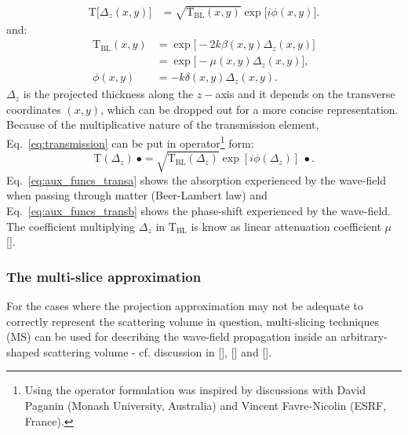 \begin{refsection}
\begin{align}
\mathrm{T}\big[\Delta_z(x,y)] &=\sqrt{\mathrm{T}_\text{BL}(x,y)}\exp{\big[i\phi(x,y)\big]}.
\end{align}{}
and:
\begin{subequations}
\begin{align}   
    \mathrm{T}_{\text{BL}}(x,y)&=\exp{\big[-2k\beta(x,y)\Delta_z(x,y)\big]}\label{eq:aux_funcs_transa}  \\
    &=\exp{\big[-\mu(x,y)\Delta_z(x,y)\big]},\nonumber\\
    \phi(x,y)&=-k\delta(x,y)\Delta_z(x,y).\label{eq:aux_funcs_transb}
\end{align}
\end{subequations}
$\Delta_z$ is the projected thickness along the $z-$axis and it depends on the transverse coordinates $(x,y)$, which can be dropped out for a more concise representation. Because of the multiplicative nature of the transmission element, Eq.~\ref{eq:transmission} can be put in operator\footnote{Using the operator formulation was inspired by discussions with David Paganin (Monash University, Australia) and Vincent Favre-Nicolin (ESRF, France).} form:
\begin{equation}\label{eq:transmission_operator}
    \mathrm{T}(\Delta_z)~\bullet =\sqrt{\mathrm{T}_\text{BL}(\Delta_z)}\exp{[i\phi(\Delta_z)]}~\bullet.
\end{equation}
Eq.~\ref{eq:aux_funcs_transa} shows the absorption experienced by the wave-field when passing through matter (Beer-Lambert law) and Eq.~\ref{eq:aux_funcs_transb} shows the phase-shift experienced by the wave-field. The coefficient multiplying $\Delta_z$ in $\mathrm{T}_{\text{BL}}$ is know as linear attenuation coefficient $\mu$ [\cite[\textit{§1.6}]{Als-Nielsen2011}]. 

\subsubsection*{The multi-slice approximation}

For the cases where the projection approximation may not be adequate to correctly represent the scattering volume in question, multi-slicing techniques (MS) can be used for describing the wave-field propagation inside an arbitrary-shaped scattering volume - cf. discussion in [\cite[\textit{§2.7}]{Paganin2006}], [\cite{Li2017}] and [\cite{Munro2019}].


\end{refsection}
